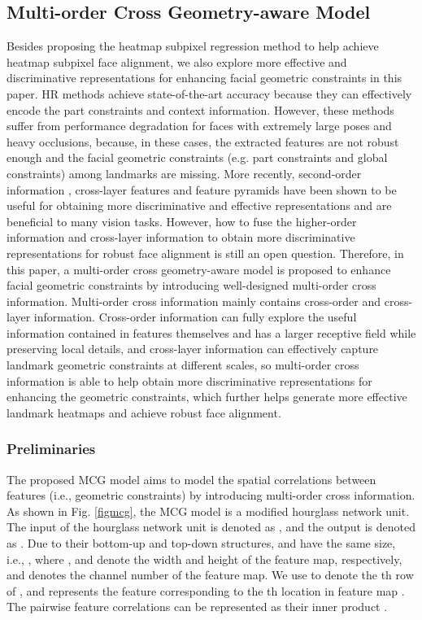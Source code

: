 \documentclass[journal]{IEEEtran}
\begin{document}
\subsection{Multi-order Cross Geometry-aware Model}
Besides proposing the heatmap subpixel regression method to help achieve heatmap subpixel face alignment, we also explore more effective and discriminative representations for enhancing facial geometric constraints in this paper. HR methods \cite{Yang2017StackedHN, Dong2018StyleAN, Liu2019SemanticAF} achieve state-of-the-art accuracy because they can effectively encode the part constraints and context information. However, these methods suffer from performance degradation for faces with extremely large poses and heavy occlusions, because, in these cases, the extracted features are not robust enough and the facial geometric constraints (e.g. part constraints and global constraints) among landmarks are missing. More recently, second-order information \cite{Gao2018GlobalSP, Dai2019SecondOrderAN, Wang2019DeepGG}, cross-layer features \cite{ long2015fully, kong2016hypernet, cai2016unified, luo2019cross} and feature pyramids \cite{luo2019cross, lin2017feature} have been shown to be useful for obtaining more discriminative and effective representations and are beneficial to many vision tasks. However, how to fuse the higher-order information and cross-layer information to obtain more discriminative representations for robust face alignment is still an open question. Therefore, in this paper, a multi-order cross geometry-aware model is proposed to enhance facial geometric constraints by introducing well-designed multi-order cross information. Multi-order cross information mainly contains cross-order and cross-layer information. Cross-order information can fully explore the useful information contained in features themselves and has a larger receptive field while preserving local details, and cross-layer information can effectively capture landmark geometric constraints at different scales, so multi-order cross information is able to help obtain more discriminative representations for enhancing the geometric constraints, which further helps generate more effective landmark heatmaps and achieve robust face alignment.
\subsubsection{Preliminaries}
The proposed MCG model aims to model the spatial correlations between features (i.e., geometric constraints) by introducing multi-order cross information. As shown in Fig. \ref{figmcg}, the MCG model is a modified hourglass network unit. The input of the hourglass network unit is denoted as , and the output is denoted as . Due to their bottom-up and top-down structures,  and  have the same size, i.e., , where ,  and  denote the width and height of the feature map, respectively, and  denotes the channel number of the feature map. We use  to denote the th row of , and  represents the feature corresponding to the  th location in feature map . The pairwise feature correlations can be represented as their inner product .
\end{document}
